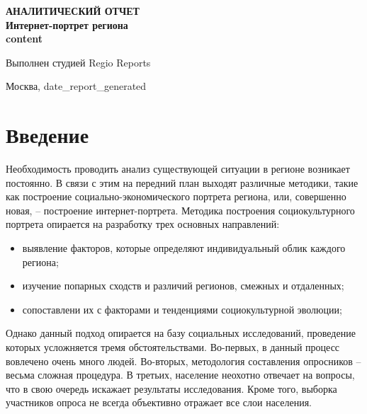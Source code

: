 \documentclass[a4paper,14pt]{extarticle}
\begin{document}
\begin{titlepage}
\date{}
\begin{center}
{\huge \textbf{АНАЛИТИЧЕСКИЙ ОТЧЕТ}} \\
\vspace{80mm}
{\Huge \textbf{ Интернет-портрет региона \\ {{content}} } } \\
\vspace{\baselineskip}
{\large Выполнен студией Regio Reports\par }
\vspace{\baselineskip}
\vspace{\baselineskip}
\vspace{\baselineskip}
{Москва, {{date_report_generated}}}
\end{center}
\end{titlepage}
\clearpage\maketitle
\thispagestyle{empty}
\newpage

\section*{Введение}
Необходимость проводить анализ существующей ситуации в регионе возникает постоянно. В связи с этим на передний план выходят различные методики, такие как построение социально-экономического портрета региона, или, совершенно новая, – построение интернет-портрета. 
Методика построения социокультурного портрета опирается на разработку трех основных направлений:
\begin{itemize}
\item выявление факторов, которые определяют индивидуальный облик каждого региона;
\item изучение попарных сходств и различий регионов, смежных и отдаленных;
\item сопоставлени их с факторами и тенденциями социокультурной эволюции;
\end{itemize}

Однако данный подход опирается на базу социальных исследований, проведение которых усложняется тремя обстоятельствами. Во-первых, в данный процесс вовлечено очень много людей. Во-вторых, методология составления опросников – весьма сложная процедура. В третьих, население неохотно отвечает на вопросы, что в свою очередь искажает результаты исследования. Кроме того, выборка участников опроса не всегда объективно отражает все слои населения. 
\end{document}
